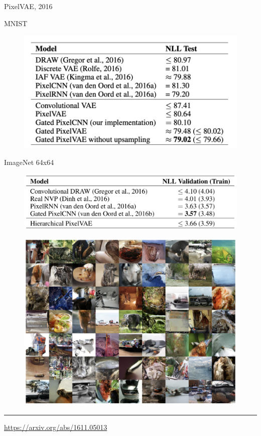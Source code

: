 \documentclass{beamer}
\begin{document}
\begin{frame}{PixelVAE, 2016}
	\begin{minipage}[t]{0.5\columnwidth}
		MNIST
		\begin{figure}
			\centering
			\includegraphics[width=0.9\linewidth]{figs/PixelVAE_5.png}
		\end{figure}
	\end{minipage}%
	\begin{minipage}[t]{0.5\columnwidth}
		ImageNet 64x64
		\begin{figure}
			\centering
			\includegraphics[width=\linewidth]{figs/PixelVAE_4.png}
		\end{figure}
	\end{minipage}
\begin{figure}
    \centering
    \includegraphics[width=0.5\linewidth]{figs/PixelVAE_3.png}
\end{figure}
\vfill
\hrule\medskip
{\scriptsize \href{https://arxiv.org/abs/1611.05013}{https://arxiv.org/abs/1611.05013}}
\end{frame}
\end{document}
